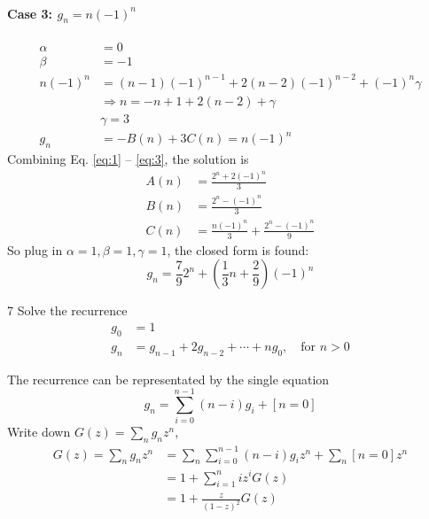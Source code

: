 \documentclass[a4paper,12pt]{article}
\makeatletter
\newtheorem*{solution}{Solution}
\theoremstyle{definition}
\renewenvironment{solution}[1][Solution] {\par\pushQED{\qed}\normalfont\topsep6\p@\@plus6\p@\relax\trivlist\item[\hskip\labelsep\bfseries#1\@addpunct{.}]\ignorespaces}{\popQED\endtrivlist\@endpefalse} \makeatother
\newenvironment{problems}{\begin{list}{}{\renewcommand{\makelabel}[1]{\textbf{##1}\hfil}}}{\end{list}}
\makeatother
\begin{document}
\begin{problems}
\begin{solution}
        \paragraph{Case 3: $g_n = n(-1)^n$}
        \begin{align}
            \alpha &= 0 \nonumber\\
            \beta &= -1  \nonumber\\
            n(-1)^n &= (n-1)(-1)^{n-1} + 2(n-2)(-1)^{n-2} + (-1)^n\gamma  \nonumber\\&\Rightarrow n = -n + 1 + 2(n-2) + \gamma  \nonumber\\ &\gamma = 3 \nonumber\\
            g_n &= - B(n)  + 3C(n)= n(-1)^n \label{eq:3} 
        \end{align}
        Combining Eq. \eqref{eq:1} -- \eqref{eq:3}, the solution is
        \begin{align*}
            A(n) &= \frac{2^n + 2(-1)^n}{3}\\
            B(n) &= \frac{2^n - (-1)^n}{3}\\
            C(n) &= \frac{n(-1)^n}{3} + \frac{2^n-(-1)^n}{9}
        \end{align*}
        So plug in $\alpha = 1,\beta = 1, \gamma = 1$, the closed form is found:
        \begin{equation*}
            g_n = \frac{7}{9}2^n + \left(\frac{1}{3}n + \frac{2}{9}\right)(-1)^n
        \end{equation*}
    \end{solution} 
    \item[7]  Solve the recurrence 
    \begin{align*}
        g_0&=1\\
        g_n&=g_{n-1}+2g_{n-2}+\cdots+ng_0,\quad \text{for }n > 0
    \end{align*}
    \begin{solution}
        The recurrence can be representated by the single equation
        \begin{equation*}
            g_n = \sum_{i=0}^{n-1} (n-i)g_i + [n=0]
        \end{equation*}
        Write down $G(z) =\sum_{n} g_n z^n$,
        \begin{align*}
            G(z) = \sum_{n} g_n z^n &= \sum_n \sum_{i=0}^{n-1} (n-i)g_iz^n + \sum_n [n=0] z^n\\
            &= 1 + \sum_{i=1}^{n} iz^{i}G(z)\\
            &= 1 + \frac{z}{(1-z)^2}G(z)\\

\end{align*}
\end{solution}
\end{problems}
\end{document}

